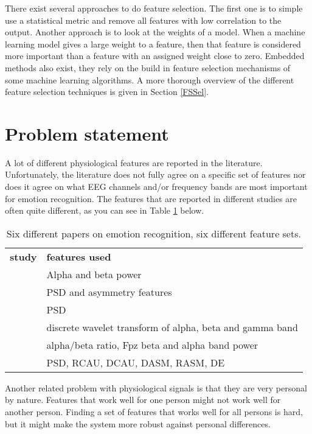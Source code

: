 \npar

There exist several approaches to do feature selection. The first one is to simple use a statistical metric and remove all features with low correlation to the output. Another approach is to look at the weights of a model. When a machine learning model gives a large weight to a feature, then that feature is considered more important than a feature with an assigned weight close to zero. Embedded methods also exist, they rely on the build in feature selection mechanisms of some machine learning algorithms. A more thorough  overview of the different feature selection techniques is given in Section \ref{FSSel}. 

\section{Problem statement}

A lot of different physiological features are reported in the literature. Unfortunately, the literature does not fully agree on a specific set of features nor does it agree on what EEG channels and/or frequency bands are most important for emotion recognition. The features that are reported in different studies are often quite different, as you can see in Table \ref{diffFeat} below.

\begin{table}[H]
\centering
\begin{tabular}{ll}
\textbf{study} & \textbf{features used}                         \\
\citep{ref4}     & Alpha and beta power                           \\
\citep{ref7}     & PSD and asymmetry features                     \\
\citep{ref8}     & PSD                                            \\
\citep{ref6}     & discrete wavelet transform of alpha, beta and gamma band \\
\citep{ExtendedPaper}	&	alpha/beta ratio, Fpz beta and alpha band power \\
\citep{killyPaper} & PSD, RCAU, DCAU, DASM, RASM, DE \\
\end{tabular}
\caption{Six different papers on emotion recognition, six different feature sets\label{diffFeat}.}
\end{table}

\npar

Another related problem with physiological signals is that they are very personal by nature. Features that work well for one person might not work well for another person\citep{DEAP}. Finding a set of features that works well for all persons is hard, but it might make the system more robust against personal differences. 

